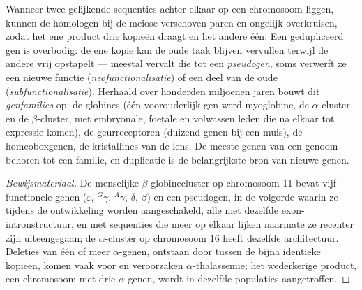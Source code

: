 \begin{proposition}\label{prop:b2:genome-diversification:duplication}
Wanneer twee gelijkende sequenties achter elkaar op een chromosoom
liggen, kunnen de homologen bij de meiose verschoven paren en ongelijk
overkruisen, zodat het ene product drie kopieën draagt en het andere
één. Een gedupliceerd gen is overbodig: de ene kopie kan de oude taak
blijven vervullen terwijl de andere vrij  opstapelt --- meestal
vervalt die tot een \emph{pseudogen}, soms verwerft ze een nieuwe functie
(\emph{neofunctionalisatie}) of een deel van de oude
(\emph{subfunctionalisatie}). Herhaald over honderden miljoenen jaren
bouwt dit \emph{genfamilies} op: de globines (één voorouderlijk gen werd
myoglobine, de $\alpha$-cluster en de $\beta$-cluster, met embryonale,
foetale en volwassen leden die na elkaar tot expressie komen), de
geurreceptoren (duizend genen bij een muis), de homeoboxgenen, de
kristallines van de lens. De meeste genen van een genoom behoren tot een
familie, en duplicatie is de belangrijkste bron van nieuwe genen.
\end{proposition}
\begin{proof}[Bewijsmateriaal]
De menselijke $\beta$-globinecluster op chromosoom 11 bevat vijf
functionele genen ($\varepsilon$, $^{G}\gamma$, $^{A}\gamma$,
$\delta$, $\beta$) en een pseudogen, in de volgorde waarin ze tijdens
de ontwikkeling worden aangeschakeld, alle met dezelfde exon-intronstructuur,
en met sequenties die meer op elkaar lijken naarmate ze recenter zijn
uiteengegaan; de $\alpha$-cluster op chromosoom 16 heeft dezelfde
architectuur. Deleties van één of meer $\alpha$-genen, ontstaan door
 tussen de bijna identieke kopieën, komen vaak
voor en veroorzaken $\alpha$-thalassemie; het wederkerige product, een
chromosoom met drie $\alpha$-genen, wordt in dezelfde populaties
aangetroffen.
\end{proof}

